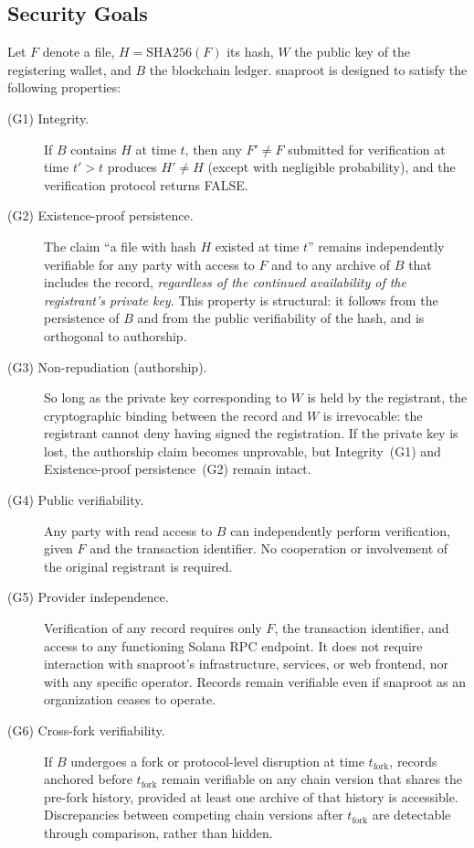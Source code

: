 \documentclass[11pt,a4paper]{article}
\begin{document}
\subsection{Security Goals}
\label{sec:threat:goals}

Let $F$ denote a file, $H = \mathrm{SHA256}(F)$ its hash, $W$ the
public key of the registering wallet, and $B$ the blockchain ledger.
snaproot is designed to satisfy the following properties:

\begin{description}
\item[(G1) Integrity.] If $B$ contains $H$ at time $t$, then any
$F' \neq F$ submitted for verification at time $t' > t$ produces
$H' \neq H$ (except with negligible probability), and the verification
protocol returns FALSE.

\item[(G2) Existence-proof persistence.] The claim ``a file with hash
$H$ existed at time $t$'' remains independently verifiable for any party
with access to $F$ and to any archive of $B$ that includes the record,
\emph{regardless of the continued availability of the registrant's
private key}. This property is structural: it follows from the
persistence of $B$ and from the public verifiability of the hash, and
is orthogonal to authorship.

\item[(G3) Non-repudiation (authorship).] So long as the private key
corresponding to $W$ is held by the registrant, the cryptographic
binding between the record and $W$ is irrevocable: the registrant
cannot deny having signed the registration. If the private key is
lost, the authorship claim becomes unprovable, but Integrity~(G1) and
Existence-proof persistence~(G2) remain intact.

\item[(G4) Public verifiability.] Any party with read access to $B$ can
independently perform verification, given $F$ and the transaction
identifier. No cooperation or involvement of the original registrant is
required.

\item[(G5) Provider independence.] Verification of any record requires
only $F$, the transaction identifier, and access to any functioning
Solana RPC endpoint. It does not require interaction with snaproot's
infrastructure, services, or web frontend, nor with any specific
operator. Records remain verifiable even if snaproot as an organization
ceases to operate.

\item[(G6) Cross-fork verifiability.] If $B$ undergoes a fork or
protocol-level disruption at time $t_{\text{fork}}$, records anchored
before $t_{\text{fork}}$ remain verifiable on any chain version that
shares the pre-fork history, provided at least one archive of that
history is accessible. Discrepancies between competing chain versions
after $t_{\text{fork}}$ are detectable through comparison, rather than
hidden.
\end{description}
\end{document}

